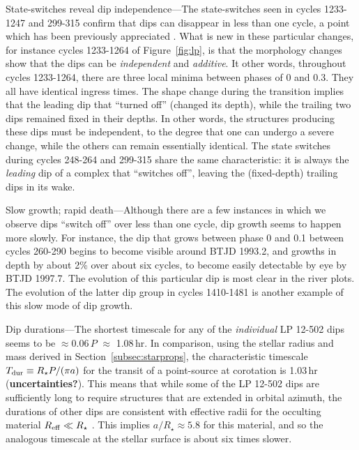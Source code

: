 \documentclass[11pt,twocolumn,tighten]{aastex63}
\begin{document}
{\sc State-switches reveal dip independence}---The state-switches seen
in cycles 1233-1247 and 299-315 confirm that dips can disappear in
less than one cycle, a point which has been previously appreciated
\citep{2017AJ....153..152S}.  What is new in these particular changes,
for instance cycles 1233-1264 of Figure~\ref{fig:lp}, is that the
morphology changes show that the dips can be {\it independent} and
{\it additive}.  It other words, throughout cycles 1233-1264, there
are three local minima between phases of 0 and 0.3.  They all have
identical ingress times.  The shape change during the transition
implies that the leading dip that ``turned off'' (changed its depth),
while the trailing two dips remained fixed in their depths.  In other
words, the structures producing these dips must be independent, to the
degree that one can undergo a severe change, while the others can
remain essentially identical.  The state switches during cycles
248-264 and 299-315 share the same characteristic: it is always the
{\it leading} dip of a complex that ``switches off'', leaving the
(fixed-depth) trailing dips in its wake.

{\sc Slow growth; rapid death}---Although there are a few instances in
which we observe dips ``switch off'' over less than one cycle, dip
growth seems to happen more slowly.  For instance, the dip that grows
between phase 0 and 0.1 between cycles 260-290 begins to become
visible around BTJD 1993.2, and growths in depth by about 2\% over
about six cycles, to become easily detectable by eye by BTJD 1997.7.
The evolution of this particular dip is most clear in the river plots.
The evolution of the latter dip group in cycles 1410-1481 is another
example of this slow mode of dip growth.

{\sc Dip durations}---The shortest timescale for any of the {\it
individual} LP 12-502 dips seems to be $\approx$0.06\,$P$ $\approx$
1.08\,hr.  In comparison, using the stellar radius and mass derived in
Section~\ref{subsec:starprops}, the characteristic timescale $T_{\rm
dur} \equiv R_\star P / (\pi a)$ for the transit of a point-source at
corotation is 1.03\,hr ({\bf uncertainties?}).  This means that while
some of the LP 12-502 dips are sufficiently long to require structures
that are extended in orbital azimuth, the durations of other dips are
consistent with effective radii for the occulting material $R_{\rm
eff} \ll R_\star$ .  This implies $a/R_\star \approx 5.8$ for this
material, and so the analogous timescale at the stellar surface is
about six times slower.
\end{document}
